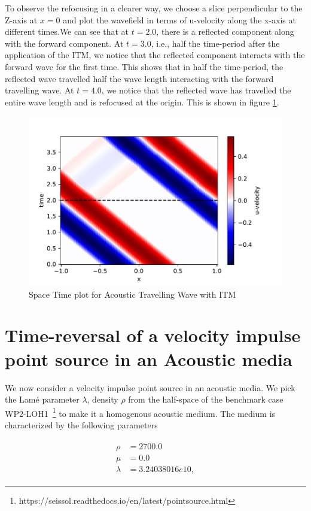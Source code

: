 To observe the refocusing in a clearer way, we choose a slice perpendicular to the Z-axis at $x=0$ and plot the wavefield in terms of u-velocity along the x-axis
at different times.We can see that at $t=2.0$, there is a reflected component along with the forward component. At $t=3.0$, i.e., half the time-period after
the application of the \ac{ITM}, we notice that the reflected component interacts with the forward wave for the first time. This shows that in half the time-period, the reflected wave travelled half the wave length interacting
with the forward travelling wave. At $t=4.0$, we notice that the reflected wave has travelled the entire wave length and is refocused at the origin. 
This is shown in figure \ref{fig:space-timeplot-travelling}.

\begin{figure}
    \centering
    \includegraphics[width=0.75\linewidth]{figures/space-time-plot-travelling.pdf}
    \caption{Space Time plot for Acoustic Travelling Wave with \ac{ITM}}
    \label{fig:space-timeplot-travelling}
\end{figure}

\section{Time-reversal of a velocity impulse point source in an Acoustic media} \label{sec:acousticITM}

We now consider a velocity impulse point source in an acoustic media. We pick the Lam\'{e} parameter $\lambda$, density $\rho$ 
from the half-space of the benchmark case WP2-LOH1~\footnote[1]{https://seissol.readthedocs.io/en/latest/pointsource.html} to make it a homogenous acoustic medium. 
The medium is characterized by the following parameters

\begin{align}
    \begin{split}
        \rho &=    2700.0 \\
        \mu &=     0.0 \\
        \lambda &= 3.24038016e10 ,
    \end{split}
\end{align}

